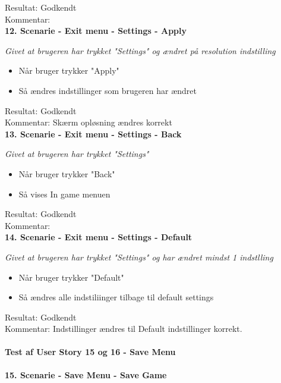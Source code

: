 Resultat: Godkendt\\
Kommentar:\\

\textbf{12. Scenarie - Exit menu - Settings - Apply}

\textit{Givet at brugeren har trykket "Settings" og ændret på resolution indstilling}

\begin{itemize}
  \item Når bruger trykker "Apply"
  \item Så ændres indstillinger som brugeren har ændret
\end{itemize}

Resultat: Godkendt\\
Kommentar: Skærm opløsning ændres korrekt\\

\textbf{13. Scenarie - Exit menu - Settings - Back}

\textit{Givet at brugeren har trykket "Settings"}

\begin{itemize}
  \item Når bruger trykker "Back"
  \item Så vises In game menuen
\end{itemize}

Resultat: Godkendt\\
Kommentar:\\

\textbf{14. Scenarie - Exit menu - Settings - Default}

\textit{Givet at brugeren har trykket "Settings" og har ændret mindst 1 indstlling}

\begin{itemize}
  \item Når bruger trykker "Default"
  \item Så ændres alle indstiliinger tilbage til default settings
\end{itemize}

Resultat: Godkendt\\
Kommentar: Indstillinger ændres til Default indstillinger korrekt.\\

\paragraph{Test af User Story 15 og 16 - Save Menu}

\textbf{15. Scenarie - Save Menu - Save Game}

